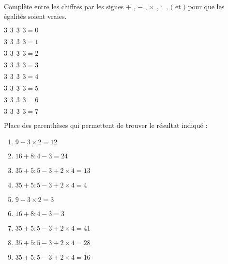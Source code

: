 \begin{exercice}
Complète entre les chiffres par les signes  \textcolor{B2}{$+$} , \textcolor{B2}{$-$} , \textcolor{B2}{$\times$} , \textcolor{B2}{$:$} , \textcolor{B2}{$($} et \textcolor{B2}{$)$} pour que les égalités soient vraies.
\begin{colenumerate}{3}
 \item $3 \hspace{5pt} 3  \hspace{5pt} 3  \hspace{5pt} 3 = 0$
 \item $3 \hspace{5pt} 3 \hspace{5pt} 3 \hspace{5pt} 3 = 1$
 \item $3 \hspace{5pt} 3 \hspace{5pt} 3 \hspace{5pt} 3 = 2$
 \item $3 \hspace{5pt} 3 \hspace{5pt} 3 \hspace{5pt} 3 = 3$
 \item $3 \hspace{5pt} 3 \hspace{5pt} 3 \hspace{5pt} 3 = 4$
 \item $3 \hspace{5pt} 3 \hspace{5pt} 3 \hspace{5pt} 3 = 5$
 \item $3 \hspace{5pt} 3 \hspace{5pt} 3 \hspace{5pt} 3 = 6$
 \item $3 \hspace{5pt} 3 \hspace{5pt} 3 \hspace{5pt} 3 = 7$
 \end{colenumerate}
\end{exercice}


\begin{exercice}
Place des parenthèses qui permettent de trouver le résultat indiqué :
\begin{enumerate}
 \item $9 - 3 \times 2 = 12$
 \item $16 + 8 : 4 - 3 = 24$
 \item $35 + 5 : 5 - 3 + 2 \times 4 = 13$
 \item $35 + 5 : 5 - 3 + 2 \times 4 = 4$
 \item $9 - 3 \times 2 = 3$
 \item $16 + 8 : 4 - 3 = 3$
 \item $35 + 5 : 5 - 3 + 2 \times 4 = 41$
 \item $35 + 5 : 5 - 3 + 2 \times 4 = 28$
 \item $35 + 5 : 5 - 3 + 2 \times 4 = 16$
 \end{enumerate}
\end{exercice}


